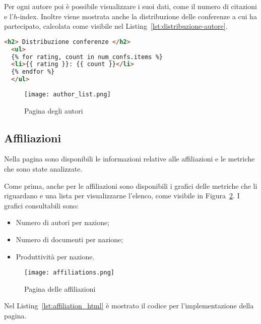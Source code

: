 Per ogni autore poi è possibile visualizzare i suoi dati, come il numero di citazioni e l'$h$-index. Inoltre viene mostrata anche la distribuzione delle conferenze a cui ha partecipato, calcolata come visibile nel Listing~\ref{lst:distribuzione-autore}.

\begin{lstlisting}[language=html, caption=Estratto di \texttt{template/author\_info.html} per la visualizzazione della distribuzione delle conferenze a cui l'autore partecipa, label=lst:distribuzione-autore]
  <h2> Distribuzione conferenze </h2>
  <ul>
  {% for rating, count in num_confs.items %}
  <li>{{ rating }}: {{ count }}</li>
  {% endfor %}
  </ul>  

\end{lstlisting}

\begin{figure}
  \centering
  \texttt{[image: author\_list.png]}
  \caption{Pagina degli autori}
  \label{fig:lista-autori}
\end{figure}



\subsection{Affiliazioni}

Nella pagina sono disponibili le informazioni relative alle affiliazioni e le metriche che sono state analizzate.

Come prima, anche per le affiliazioni sono disponibili i grafici delle metriche che li riguardano e una lista per visualizzarne l'elenco, come visibile in Figura~\ref{fig:affiliations}. I grafici consultabili sono:
\begin{itemize}
  \item Numero di autori per nazione;
  \item Numero di documenti per nazione;
  \item Produttività per nazione.
\end{itemize}

\begin{figure}
  \centering
  \texttt{[image: affiliations.png]}
  \caption{Pagina delle affiliazioni}
  \label{fig:affiliations}
\end{figure}

Nel Listing~\ref{lst:affiliation_html} è mostrato il codice per l'implementazione della pagina. 

